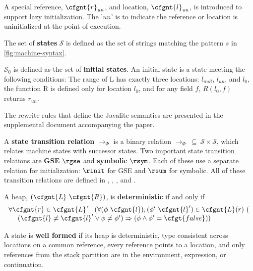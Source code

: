 A special reference, $\cfgnt{r}_\mathit{un}$, and location,
$\cfgnt{l}_\mathit{un}$, is introduced to support lazy
initialization. The '$\mathit{un}$' is to indicate the reference or
location is uninitialized at the point of execution.

\begin{definition}
\label{def:state}
The set of \textbf{states} $\mathcal{S}$ is defined as the set of strings matching the pattern $s$ in \ref{fig:machine-syntax}.
\end{definition}

\begin{definition}
\label{def:initstate}
$\mathcal{S}_0$ is defined as the set of \textbf{initial states}. An
initial state is a state meeting the following conditions: The range
of L has exactly three locations: $l_{null}$, $l_{un}$, and $l_0$, the
function R is defined only for location $l_0$, and for any field $f$,
$R(l_0,f)$ returns $r_{un}$.
\end{definition}

The rewrite rules that define the Javalite semantics are presented in
the supplemental document accompanying the paper.

\begin{definition}
A \textbf{state transition relation} $\rightarrow_{\Phi}$ is a binary
relation $\rightarrow_{\Phi}\ \subseteq\ \mathcal{S} \times
\mathcal{S} $, which relates machine states with successor states. Two
important state transition relations are \textbf{GSE} $\rgse$ and
\textbf{symbolic} $\rsym$. Each of these use a separate relation for
initialization: $\rinit$ for GSE and $\rsum$ for symbolic. All of
these transition relations are defined in ,
, , and .
\end{definition}

\begin{definition}
A heap, $(\cfgnt{L}\ \cfgnt{R})$, is \textbf{deterministic} if and only if 
\[
\begin{array}{l}
\forall \cfgnt{r} \in \cfgnt{L}^\leftarrow\ (\forall (\phi\ \cfgnt{l}),(\phi^\prime\ \cfgnt{l}^\prime) \in \cfgnt{L}(r)\ (\\
\ \ \ \ (\cfgnt{l} \neq \cfgnt{l}^\prime \vee \phi \neq \phi^\prime) \Rightarrow (\phi \wedge \phi^\prime = \cfgt{false}))
\end{array}
\]
\end{definition}

\begin{definition}
A state is \textbf{well formed} if its heap is deterministic, type consistent across locations on a common reference, every reference points to a location, and only references from the stack partition are in the environment, expression, or continuation.
\end{definition}

